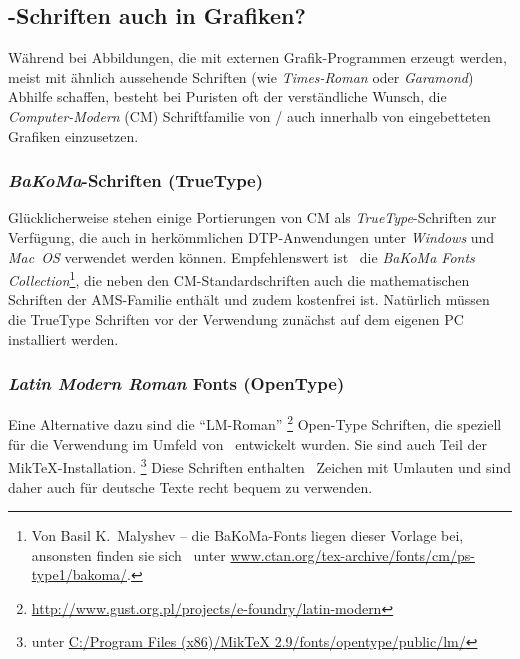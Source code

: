 \subsection{\tex-Schriften auch in Grafiken?}
\label{sec:tex-schriften-in-grafiken}

Während bei Abbildungen, die mit externen
Grafik-Programmen erzeugt werden, meist mit ähnlich aussehende
Schriften (wie \emph{Times-Roman} oder \emph{Garamond}) Abhilfe schaffen,
besteht bei Puristen oft der verständliche Wunsch, die 
\emph{Computer-Modern} (CM) Schriftfamilie von {\tex}/{\latex} auch
innerhalb von eingebetteten Grafiken einzusetzen.

\subsubsection{\emph{BaKoMa}-Schriften (TrueType)}

Glücklicherweise stehen einige Portierungen von CM als {\em
TrueType}-Schriften zur Verfügung, die auch in herkömmlichen
DTP-Anwendungen unter \emph{Windows} und \emph{Mac~OS} verwendet werden
können. Empfehlenswert ist \zB\ die \emph{BaKoMa Fonts
Collection}\footnote{Von Basil K.\ Malyshev -- die BaKoMa-Fonts
liegen dieser Vorlage bei, ansonsten finden sie sich \zB\ unter
\url{www.ctan.org/tex-archive/fonts/cm/ps-type1/bakoma/}.}, die
neben den CM-Standardschriften auch die mathematischen Schriften
der AMS-Familie ent\-hält und zudem kostenfrei ist. Natürlich
müssen die TrueType Schriften vor der Verwendung zunächst auf dem
eigenen PC installiert werden. 

\subsubsection{\emph{Latin Modern Roman} Fonts (OpenType)}

Eine Alternative dazu sind die "`LM-Roman"'%
\footnote{\url{http://www.gust.org.pl/projects/e-foundry/latin-modern}}
 Open-Type Schriften, die speziell für die Verwendung im Umfeld von \latex\ entwickelt wurden.
Sie sind auch Teil der MikTeX-Installation.%
\footnote{\zB unter \url{C:/Program Files (x86)/MikTeX 2.9/fonts/opentype/public/lm/}}
Diese Schriften enthalten \ua\ Zeichen mit Umlauten und sind daher auch für deutsche Texte recht
bequem zu verwenden.



